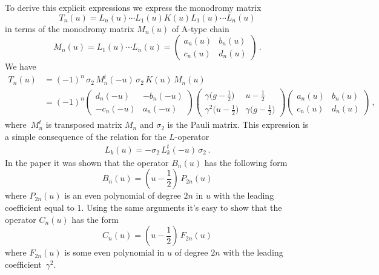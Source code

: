 \documentclass[a4paper,11pt]{article}
\numberwithin{equation}{section}
\begin{document}
To derive this explicit expressions we express the monodromy matrix
\begin{equation} \nonumber
	T_n(u) = L_n(u) \cdots L_1(u) K(u) L_1(u) \cdots L_n(u)
\end{equation}
in terms of the monodromy matrix $M_n(u)$ of A-type chain
\begin{equation} \nonumber
	M_n(u) = L_1(u) \cdots L_n(u) = \begin{pmatrix}
		a_n(u) & b_n(u) \\
		c_n(u) & d_n(u)
	\end{pmatrix} \,.
\end{equation}
We have
\begin{align}
	\nonumber
	T_n(u) & = (-1)^n\,\sigma_2\,M_n^t(-u)\,\sigma_2\,K(u)\,M_n(u)
	\\ 
	\nonumber
	& =
	(-1)^n \begin{pmatrix}
		d_n(-u) & -b_n(-u) \\
		-c_n(-u) & a_n(-u)
	\end{pmatrix} \begin{pmatrix}
		\gamma\bigl(g - \frac{1}{2} \bigr) & u - \frac{1}{2} \\[6pt]
		\gamma^2 \bigl(u - \frac{1}{2} \bigr) & \gamma\bigl(g - \frac{1}{2} \bigr)
	\end{pmatrix} \begin{pmatrix}
		a_n(u) & b_n(u) \\
		c_n(u) & d_n(u)
	\end{pmatrix} \,,
\end{align}
where~$M_n^t$ is transposed matrix $M_n$ and $\sigma_2$ is the Pauli matrix.
This expression is a simple consequence of the relation for the $L$-operator
\begin{align} \nonumber
	L_k(u) = -\sigma_2\,L^t_k(-u)\,\sigma_2 \,.
\end{align}
In the paper \cite{ADV2} it was shown that the operator $B_n(u)$ has the following form
\begin{equation} \label{B_n}
	B_n(u) = (u-\frac{1}{2})\,P_{2n}(u)
\end{equation}	
where $P_{2n}(u)$ is an even polynomial of degree $2n$ in $u$ with the leading coefficient equal to $1$.
Using the same arguments it's easy to show that the operator $C_n(u)$ has the form
\begin{equation} \label{C_n}
	C_n(u) = (u-\frac{1}{2})\,F_{2n}(u)
\end{equation}
where $F_{2n}(u)$ is some even polynomial in $u$ of degree $2n$ with the leading coefficient~$\gamma^2$.
\end{document}
